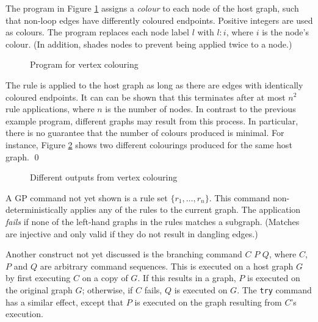 \begin{example}
The program in Figure \ref{fig:vertex-colouring} assigns a \emph{colour}\/ to each node of the host graph, such that non-loop edges have differently coloured endpoints. Positive integers are used as colours. The program replaces each node label $l$\/ with $l{:}i$, where $i$\/ is the node's colour. (In addition,  shades nodes to prevent being applied twice to a node.)

\begin{figure}[htb]
\begin{center}
 
\end{center}
\caption{Program for vertex colouring}\label{fig:vertex-colouring}
\end{figure}

The rule  is applied to the host graph as long as there are edges with identically coloured endpoints. It can can be shown that this terminates after at most $n^2$ rule applications, where $n$\/ is the number of nodes. In contrast to the previous example program, different graphs may result from this process. In particular, there is no guarantee that the number of colours produced is minimal. For instance, Figure \ref{fig:colour_results} shows two different colourings produced for the same host graph.
\qed
\end{example}

\begin{figure}[htb]
\begin{center}
 
\end{center}
\caption{Different outputs from vertex colouring}\label{fig:colour_results}
\end{figure}

A GP command not yet shown is a rule set $\{r_1,\dots,r_n\}$. This command non-deterministically applies any of the rules to the current graph. The application \emph{fails}\/ if none of the left-hand graphs in the rules matches a subgraph. (Matches are injective and only valid if they do not result in dangling edges.)

Another construct not yet discussed is the branching command  $C$  $P$  $Q$, where $C$, $P$ and $Q$ are arbitrary command sequences. This is executed on a host graph $G$ by first executing $C$ on a copy of $G$. If this results in a graph, $P$\/ is executed on the original graph $G$; otherwise, if $C$ fails, $Q$ is executed on $G$. The \texttt{try} command has a similar effect, except that $P$\/ is executed on the graph resulting from $C$'s execution. 